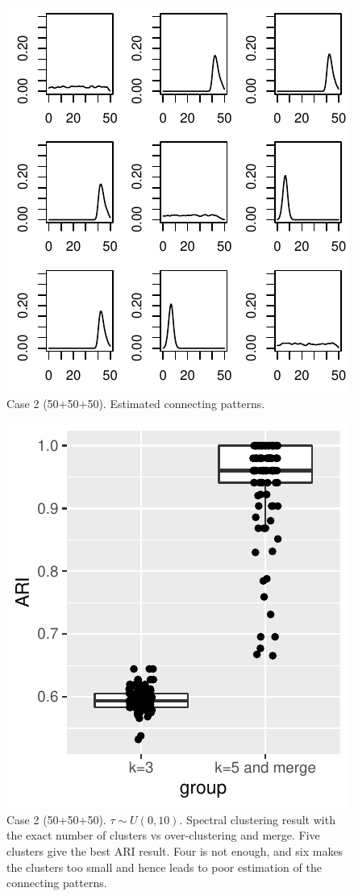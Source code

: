 \begin{figure}[H]
\includegraphics[width=.6\textwidth]{../simulation/plots/case2_conn_patt_matrix}
\caption{Case 2 (50+50+50). Estimated connecting patterns.}
\end{figure}


\begin{figure}[H]
\includegraphics[width=.6\textwidth]{../simulation/plots/case2_overclus_result_boxplot}
\caption{Case 2 (50+50+50). $\tau\sim U(0,10)$. Spectral clustering result with the exact number of clusters vs over-clustering  and merge. 
Five clusters give the best ARI result. Four is not enough, and six makes the clusters too small and hence leads to poor estimation of the connecting patterns.}
\end{figure}

